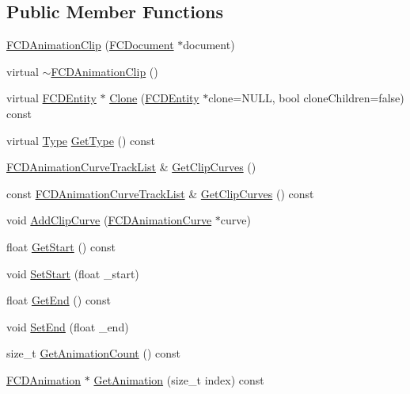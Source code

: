 \subsection*{Public Member Functions}
\begin{DoxyCompactItemize}
\item 
\hyperlink{classFCDAnimationClip_a7b9a575f0a69924becf22c31309f052e}{FCDAnimationClip} (\hyperlink{classFCDocument}{FCDocument} $\ast$document)
\item 
virtual \hyperlink{classFCDAnimationClip_a277876f9e175f04ae9a954aa464b371a}{$\sim$FCDAnimationClip} ()
\item 
virtual \hyperlink{classFCDEntity}{FCDEntity} $\ast$ \hyperlink{classFCDAnimationClip_a238068520ca5d5932252fd73f18eb573}{Clone} (\hyperlink{classFCDEntity}{FCDEntity} $\ast$clone=NULL, bool cloneChildren=false) const 
\item 
virtual \hyperlink{classFCDEntity_a9301a4bd5f4d4190ec13e40db4effdd7}{Type} \hyperlink{classFCDAnimationClip_aef1051c0a708829ae1800e4362b8af7e}{GetType} () const 
\item 
\hyperlink{classFUTrackedList}{FCDAnimationCurveTrackList} \& \hyperlink{classFCDAnimationClip_ad3d1c50b00da7dc6092e893f2b2ba1a0}{GetClipCurves} ()
\item 
const \hyperlink{classFUTrackedList}{FCDAnimationCurveTrackList} \& \hyperlink{classFCDAnimationClip_ad815a4be325c0f6e375d9a2dd3ea6fdf}{GetClipCurves} () const 
\item 
void \hyperlink{classFCDAnimationClip_a1adf70ff7bf8a26cd7769a93a80eea02}{AddClipCurve} (\hyperlink{classFCDAnimationCurve}{FCDAnimationCurve} $\ast$curve)
\item 
float \hyperlink{classFCDAnimationClip_ab7d15c33a1ead6ed4b87b9cc6e75b866}{GetStart} () const 
\item 
void \hyperlink{classFCDAnimationClip_aba58782b21762c1602022accfafce340}{SetStart} (float \_\-start)
\item 
float \hyperlink{classFCDAnimationClip_a1cef2ba64b8f98f430d394423f1c37f4}{GetEnd} () const 
\item 
void \hyperlink{classFCDAnimationClip_aa55db11384a406c48b834326a964e666}{SetEnd} (float \_\-end)
\item 
size\_\-t \hyperlink{classFCDAnimationClip_aa1f97cce1c7ac2d9bb019404a73e923c}{GetAnimationCount} () const 
\item 
\hyperlink{classFCDAnimation}{FCDAnimation} $\ast$ \hyperlink{classFCDAnimationClip_a11169a159cea62896fa3f4c34fa0b888}{GetAnimation} (size\_\-t index) const 

\end{DoxyCompactItemize}
